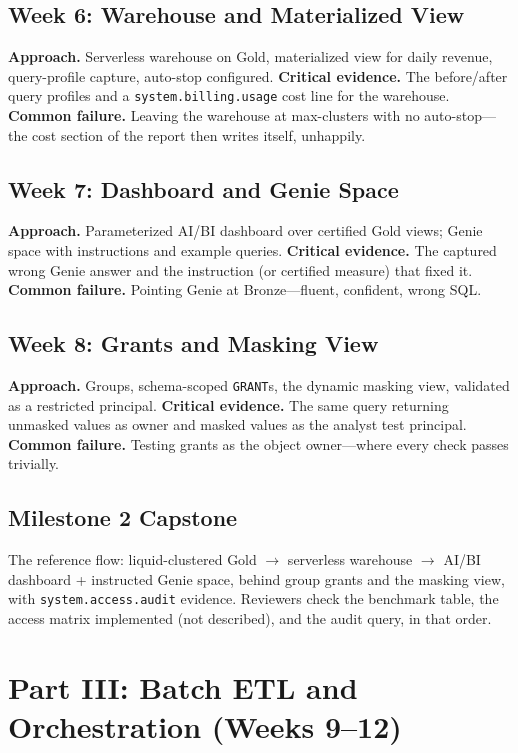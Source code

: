 \subsection{Week 6: Warehouse and Materialized View}
\textbf{Approach.} Serverless warehouse on Gold, materialized view for daily revenue, query-profile
capture, auto-stop configured.
\textbf{Critical evidence.} The before/after query profiles and a \texttt{system.billing.usage}
cost line for the warehouse.
\textbf{Common failure.} Leaving the warehouse at max-clusters with no auto-stop---the cost section
of the report then writes itself, unhappily.

\subsection{Week 7: Dashboard and Genie Space}
\textbf{Approach.} Parameterized AI/BI dashboard over certified Gold views; Genie space with
instructions and example queries.
\textbf{Critical evidence.} The captured wrong Genie answer and the instruction (or certified
measure) that fixed it.
\textbf{Common failure.} Pointing Genie at Bronze---fluent, confident, wrong SQL.

\subsection{Week 8: Grants and Masking View}
\textbf{Approach.} Groups, schema-scoped \texttt{GRANT}s, the dynamic masking view, validated as a
restricted principal.
\textbf{Critical evidence.} The same query returning unmasked values as owner and masked values as
the analyst test principal.
\textbf{Common failure.} Testing grants as the object owner---where every check passes trivially.

\subsection{Milestone 2 Capstone}
The reference flow: liquid-clustered Gold $\rightarrow$ serverless warehouse $\rightarrow$ AI/BI
dashboard + instructed Genie space, behind group grants and the masking view, with
\texttt{system.access.audit} evidence. Reviewers check the benchmark table, the access matrix
implemented (not described), and the audit query, in that order.

\section{Part III: Batch ETL and Orchestration (Weeks 9--12)}
